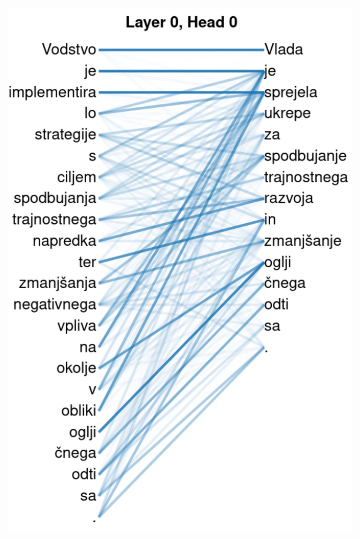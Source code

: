 \documentclass[fleqn,moreauthors,10pt]{ds_report}
\begin{document}
\begin{figure}[ht]
    \centering
    \begin{subfigure}{0.45\linewidth} %
        \centering
        \includegraphics[width=\textwidth]{report/fig/t5-sen1-conn1.pdf}
        \label{fig:t5-sen1-conn1}
    \end{subfigure}
    \hfill %
    \begin{subfigure}{0.45\linewidth} %
        \centering

\end{subfigure}
\end{figure}
\end{document}

